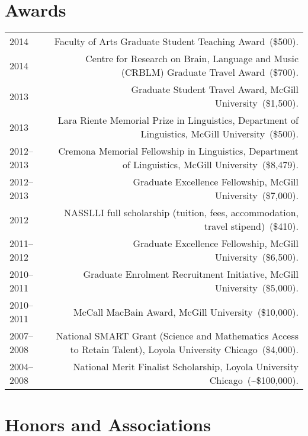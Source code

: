 \documentclass[letterpaper]{article}
\makeatletter
\newcommand{\myvrule}{\color{lightgray}\vrule width 1.0pt}
\newenvironment{cvsection}{%
  \renewcommand{\arraystretch}{1.75}
  \begin{longtable}[l]{@{} L R @{}}
}{%
  \end{longtable}
}
\newcommand{\award}[2]{%
  #1~(#2). %
}
\makeatother
\begin{document}
\section*{Awards}

\begin{cvsection}
  2014 & \award{Faculty of Arts Graduate Student Teaching Award}{\$500} \\

  2014 & \award{Centre for Research on Brain, Language and Music (CRBLM)
  Graduate Travel Award}{\$700} \\

  2013 & \award{Graduate Student Travel Award, McGill University}{\$1,500} \\

  2013 & \award{Lara Riente Memorial Prize in Linguistics, Department of
  Linguistics, McGill University}{\$500} \\

  2012--2013 & \award{Cremona Memorial Fellowship in Linguistics, Department of
  Linguistics, McGill University}{\$8,479} \\

  2012--2013 & \award{Graduate Excellence Fellowship, McGill
  University}{\$7,000} \\

  2012 & \award{NASSLLI full scholarship (tuition, fees, accommodation, travel
  stipend)}{\$410} \\

  2011--2012 & \award{Graduate Excellence Fellowship, McGill
  University}{\$6,500} \\

  2010--2011 & \award{Graduate Enrolment Recruitment Initiative, McGill
  University}{\$5,000} \\

  2010--2011 & \award{McCall MacBain Award, McGill University}{\$10,000} \\

  2007--2008 & \award{National SMART Grant (Science and Mathematics Access to
  Retain Talent), Loyola University Chicago}{\$4,000} \\

  2004--2008 & \award{National Merit Finalist Scholarship, Loyola University
  Chicago}{\textasciitilde\$100,000} \\
\end{cvsection}



\section*{Honors and Associations}
\end{document}
